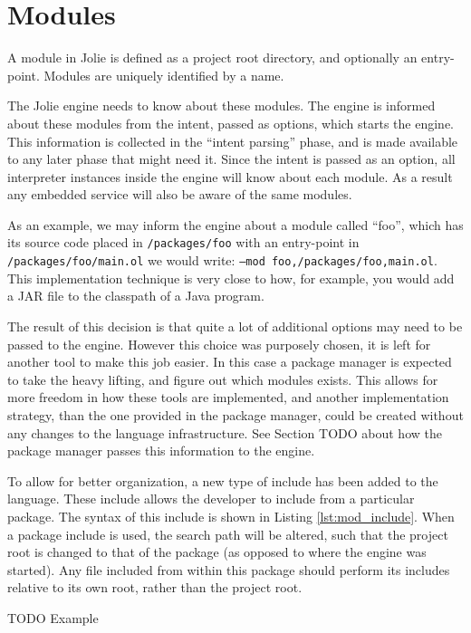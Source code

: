 \section{Modules}

A module in Jolie is defined as a project root directory, and optionally an
entry-point. Modules are uniquely identified by a name.

The Jolie engine needs to know about these modules. The engine is informed
about these modules from the intent, passed as options, which starts the
engine. This information is collected in the ``intent parsing'' phase, and is
made available to any later phase that might need it.  Since the intent is
passed as an option, all interpreter instances inside the engine will know
about each module.  As a result any embedded service will also be aware of the
same modules.

As an example, we may inform the engine about a module called ``foo'', which
has its source code placed in \verb!/packages/foo!  with an entry-point in
\verb!/packages/foo/main.ol! we would write: \texttt{--mod
foo,/packages/foo,main.ol}. This implementation technique is very close to
how, for example, you would add a JAR file to the classpath of a Java program.

The result of this decision is that quite a lot of additional options may need
to be passed to the engine. However this choice was purposely chosen, it is
left for another tool to make this job easier. In this case a package manager
is expected to take the heavy lifting, and figure out which modules exists.
This allows for more freedom in how these tools are implemented, and another
implementation strategy, than the one provided in the package manager, could be
created without any changes to the language infrastructure. See Section TODO
about how the package manager passes this information to the engine.

To allow for better organization, a new type of include has been added to the
language. These include allows the developer to include from a particular
package. The syntax of this include is shown in Listing \ref{lst:mod_include}.
When a package include is used, the search path will be altered, such that the
project root is changed to that of the package (as opposed to where the engine
was started). Any file included from within this package should perform its
includes relative to its own root, rather than the project root.

TODO Example

